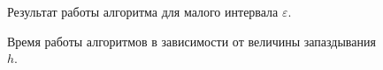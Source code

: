 \begin{figure}[bh]
        \noindent{}
        \caption{Результат работы алгоритма для малого интервала $\varepsilon$.}
        \label{img:ex-small-control}
\end{figure}
\begin{figure}[bh]
        \noindent{}
        \caption{Время работы алгоритмов в зависимости от величины запаздывания~$h$.}
        \label{img:cpu}
\end{figure}